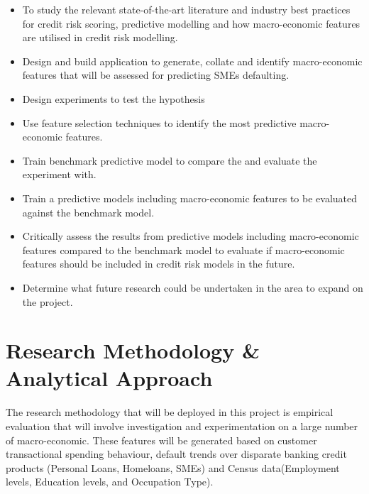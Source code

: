 \begin{itemize}
	\item To study the relevant state-of-the-art literature and industry best practices for credit risk scoring, predictive modelling and how macro-economic features are utilised in credit risk modelling.
	
	\item Design and build application to generate, collate and identify macro-economic features that will be assessed for predicting SMEs defaulting.
	
	\item Design experiments to test the hypothesis
	
	\item Use feature selection techniques to identify the most predictive  macro-economic features.
	
	\item Train benchmark predictive model to compare the and evaluate the experiment with.
	
	\item Train a predictive models including macro-economic features to be evaluated against the benchmark model.

	\item Critically assess the results from predictive models including macro-economic features compared to the benchmark model to evaluate if macro-economic features should be included in credit risk models in the future.

	\item Determine what future research could be undertaken in the area to expand on the project.
\end{itemize}
	

\section{Research Methodology \& Analytical Approach}

The research methodology that will be deployed in this project is empirical evaluation that will involve investigation and experimentation on a large number of macro-economic. These features will be generated based on customer transactional spending behaviour, default trends over disparate banking credit products (Personal Loans, Homeloans, SMEs) and Census data(Employment levels, Education levels, and Occupation Type).   

